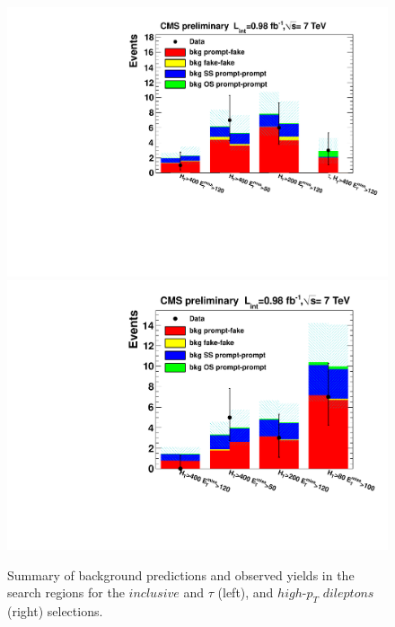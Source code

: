 \documentclass{PoS}
\begin{document}
\begin{figure}[htb]
\begin{center}
\includegraphics[width=0.48\linewidth, height=0.33\linewidth]{figss1.pdf}
\includegraphics[width=0.48\linewidth, height=0.33\linewidth]{figss2.pdf}
\end{center}
\caption{Summary of background predictions and observed yields in the search regions for the $inclusive$ and $\tau$ (left), and $high$-$p_T$ $dileptons$ (right) selections.}
\label{fig:samesignplot}
\end{figure}
\end{document}

